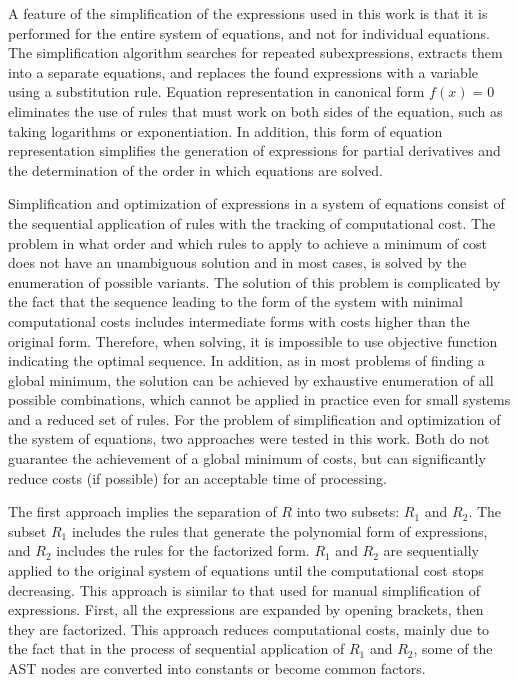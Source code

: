 \documentclass[lettersize,journal]{IEEEtran}
\begin{document}
A feature of the simplification of the expressions used in this work is that it is performed for the entire system of equations, and not for
individual equations. The simplification algorithm searches for repeated subexpressions, extracts them into a separate equations, and replaces the found
expressions with a variable using a substitution rule. Equation representation in canonical form \(f(x)=0\) eliminates the use of rules that must 
work on both sides of the equation, such as taking logarithms or exponentiation. In addition, this form of equation representation simplifies the
generation of expressions for partial derivatives and the determination of the order in which equations are solved.

Simplification and optimization of expressions in a system of equations consist of the sequential application of rules with the tracking of computational
cost. The problem in what order and which rules to apply to achieve a minimum of cost does not have an unambiguous solution and in most cases,
is solved by the enumeration of possible variants. The solution of this problem is complicated by the fact that the sequence leading to the form of 
the system with minimal computational costs includes intermediate forms with costs higher than the original form. Therefore, when solving, it 
is impossible to use objective function indicating the optimal sequence. In addition, as in most problems of finding a global minimum, 
the solution can be achieved by exhaustive enumeration of all possible combinations, which cannot be applied in practice even for small systems and a
reduced set of rules. For the problem of simplification and optimization of the system of equations, two approaches were tested in this work. 
Both do not guarantee the achievement of a global minimum of costs, but can significantly reduce costs (if possible) for an acceptable time of processing.

The first approach implies the separation of \(R\) into two subsets: \(R_1\) and \(R_2\). The subset \(R_1\) includes the rules that generate the 
polynomial form of expressions, and \(R_2\) includes the rules for the factorized form. \(R_1\) and \(R_2\) are sequentially applied to the original 
system of equations until the computational cost stops decreasing. This approach is similar to that used for manual simplification of expressions. 
First, all the expressions are expanded by opening brackets, then they are factorized. This approach reduces computational costs, mainly due to 
the fact that in the process of sequential application of \(R_1\) and \(R_2\), some of the AST nodes are converted into constants or become common factors.
\end{document}
